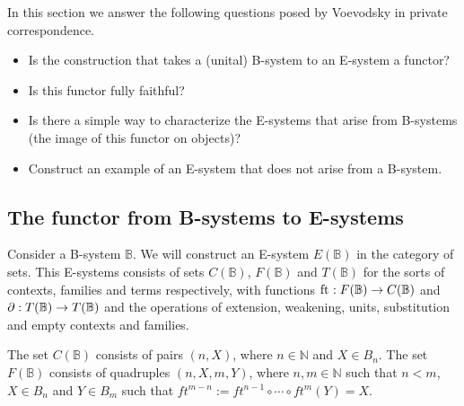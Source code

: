 \documentclass{article}
\begin{document}
In this section we answer the following questions posed by Voevodsky in private
correspondence.
\begin{itemize}
\item Is the construction that takes a (unital) B-system to an E-system a functor?
\item Is this functor fully faithful?
\item Is there a simple way to characterize the E-systems that arise from B-systems (the image of this functor on objects)?
\item Construct an example of an E-system that does not arise from a B-system.
\end{itemize}

\subsection{The functor from B-systems to E-systems}
Consider a B-system $\mathbb{B}$. We will construct an E-system $E(\mathbb{B})$
in the category of sets. This E-systems consists of sets $C(\mathbb{B})$,
$F(\mathbb{B})$ and $T(\mathbb{B})$ for the sorts of contexts, families and
terms respectively, with functions $\mathrm{ft}_{}:F(\mathbb{B})\to C(\mathbb{B})$ and
$\partial_{}:T(\mathbb{B})\to T(\mathbb{B})$ and the operations of extension,
weakening, units, substitution and empty contexts and families.

The set $C(\mathbb{B})$ consists of pairs $(n,X)$, where $n\in\mathbb{N}$ and
$X\in B_n$. The set $F(\mathbb{B})$ consists of quadruples $(n,X,m,Y)$, where
$n,m\in\mathbb{N}$ such that $n<m$, $X\in B_n$ and $Y\in B_{m}$ such that
$ft^{m-n}:=ft^{n-1}\circ\cdots\circ ft^m(Y)=X$.

%


%


%

%

%


%



\end{document}

